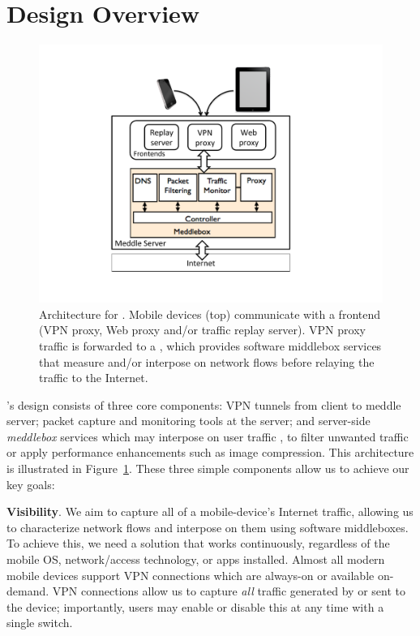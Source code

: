 \section{Design Overview}
\label{sec:overview}


\begin{figure}[tb]
\centering
\includegraphics[width=0.8\columnwidth]{figures/meddle-diagram.pdf}
\caption{Architecture for \meddle. Mobile devices (top) communicate with 
a \meddle frontend (VPN proxy, Web proxy and/or 
traffic replay server). VPN proxy traffic is forwarded to a \meddlebox, which provides 
software middlebox services that measure and/or interpose on network flows before 
relaying the traffic to the Internet.  }
\vspace{\postfigspace}
\label{fig:architecture}
\end{figure}

\meddle's design consists of three core components: VPN tunnels from client to meddle server; packet capture and monitoring tools at the server; and server-side {\it meddlebox} services which may interpose on user traffic \eg{}, to filter unwanted traffic or apply performance enhancements such as image compression. This architecture is illustrated in Figure~\ref{fig:architecture}. These three simple components allow us to achieve our key goals:

\noindent\textbf{Visibility}. We aim to capture all of a mobile-device's Internet traffic,
allowing us to characterize network flows and interpose on them using software middleboxes.
To achieve this, we need a solution that works continuously, regardless of the mobile OS, network/access 
technology, or apps installed. 
Almost all modern mobile devices support VPN connections which are always-on or available on-demand. 
VPN connections allow us to capture {\it all} traffic generated by or sent to the device; importantly, users may enable or disable this at any time with a single switch.
  
